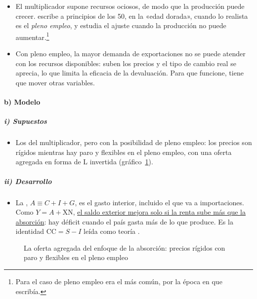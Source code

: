 \documentclass[11pt]{article}
\begin{document}
\begin{itemize}
\item El multiplicador supone recursos ociosos, de modo que la producción puede crecer. \textcite{Alexander1952Effects} escribe a principios de los 50, en la «edad dorada», cuando lo realista es el \emph{pleno empleo}, y estudia el ajuste cuando la producción no puede aumentar.\footnote{Para  el caso de pleno empleo era el más común, por la época en que escribía.}
\item Con pleno empleo, la mayor demanda de exportaciones no se puede atender con los recursos disponibles: suben los precios y el tipo de cambio real se aprecia, lo que limita la eficacia de la devaluación. Para que funcione, tiene que mover otras variables.
\end{itemize}

\paragraph{b) Modelo}

\subparagraph{i) Supuestos}

\begin{itemize}
\item Los del multiplicador, pero con la posibilidad de pleno empleo: los precios son rígidos mientras hay paro y flexibles en el pleno empleo, con una oferta agregada en forma de L invertida (gráfico~\ref{fig:absorcion-oa}).
\end{itemize}

\subparagraph{ii) Desarrollo}

\begin{itemize}
\item La , $A\equiv C+I+G$, es el gasto interior, incluido el que va a importaciones. Como $Y=A+\mathrm{XN}$,
  \uline{el saldo exterior mejora solo si la renta sube más que la absorción}: hay déficit cuando el país gasta más de lo que produce. Es la identidad $\mathrm{CC}=S-I$ leída como teoría .
\end{itemize}

\begin{figure}[H]
\centering
\caption{La oferta agregada del enfoque de la absorción: precios rígidos con paro y flexibles en el pleno empleo}\label{fig:absorcion-oa}
\end{figure}
\end{document}
